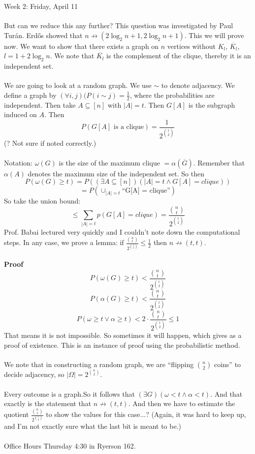\documentclass[12pt]{article}
\theoremstyle{remark}
\begin{document}
\begin{section}{Week 2: Friday, April 11}
\\\\
But can we reduce this any further? This question was investigated by Paul Tur\'an. Erd\H{o}s showed that $n \not \to (2 \log_2 n + 1, 2 \log_2 n + 1)$. This we will prove now. We want to show that there exists a graph on $n$ vertices without $K_l$, $\overline{K_l}$, $l = 1 + 2\log_2 n$. We note that $\overline{K_l}$ is the complement of the clique, thereby it is an independent set.
\\\\
We are going to look at a random graph. We use $\sim$ to denote adjacency. We define a graph by $(\forall i,j)(P(i \sim j) = \frac 12$, where the probabilities are independent. Then take $A \subseteq [n]$ with $|A| = t$. Then $G[A]$ is the subgraph induced on $A$. Then $$P(G[A] \text{ is a clique}) = \frac{1}{2^{t \choose 2}}$$ (? Not sure if noted correctly.)
\\\\Notation: $\omega(G)$ is the size of the maximum clique $=\alpha(\overline{G})$. Remember that $\alpha(A)$ denotes the maximum size of the independent set. So then 
$$P(\omega(G) \geq t) = P((\exists A \subseteq [n])(|A| = t \land G[A] = clique))$$
$$ = P(\cup_{|A| =t} \text{``G[A] = clique''})$$
So take the union bound: 
$$\leq \sum_{|A| = t} p(G[A] = clique) = \frac{{n \choose t}}{2^{t \choose 2}}$$
Prof. Babai lectured very quickly and I couldn't note down the computational steps. In any case, we prove a lemma: if $\frac{{n \choose t}}{2^{t \choose 2}} \leq \frac 12$ then $n \not \to (t,t)$.
\\\\\textbf{Proof}
$$P(\omega(G) \geq t) < \frac{{n \choose t}}{2^{t \choose 2}}$$
$$P(\alpha(G) \geq t) < \frac{{n \choose t}}{2^{t \choose 2}}$$
$$P(\omega \geq t \lor \alpha \geq t) < 2 \cdot \frac{{n \choose t}}{2^{t \choose 2}} \leq 1$$
That means it is not impossible. So sometimes it will happen, which gives as a proof of existence. This is an instance of proof using the probabilistic method.
\\\\We note that in constructing a random graph, we are ``flipping ${n \choose 2}$ coins'' to decide adjacency, so $|\Omega| = 2^{n \choose 2}$.
\\\\Every outcome is a graph.So it follows that $(\exists G)(\omega < t \land \alpha < t)$. And that exactly is the statement that $n \not \to (t,t)$. And then we have to estimate the quotient $\frac{{n \choose t}}{2^{t \choose 2}}$ to show the values for this  case...? (Again, it was hard to keep up, and I'm not exactly sure what the last bit is meant to be.)
\\\\
Office Hours Thursday 4:30 in Ryerson 162.
\end{section}
\end{document}
